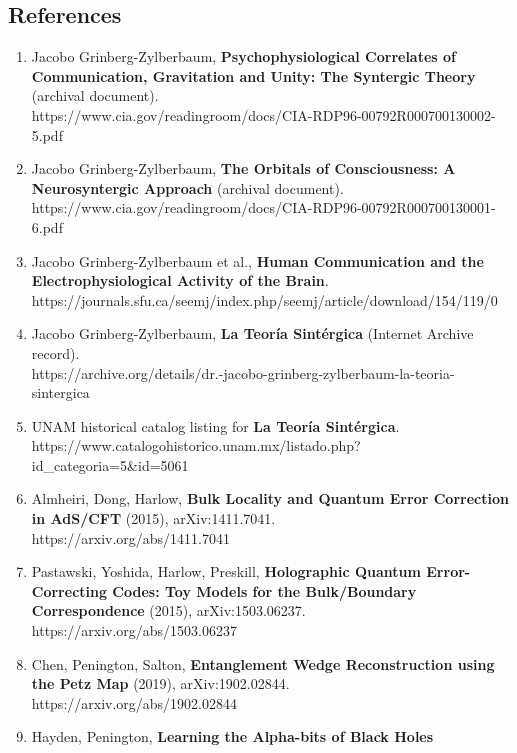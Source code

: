 \documentclass[
]{article}
\providecommand{\tightlist}{%
  \setlength{\itemsep}{0pt}\setlength{\parskip}{0pt}}
\begin{document}
\subsection{References}\label{references}

\begin{enumerate}
\def\labelenumi{\arabic{enumi}.}
\tightlist
\item
  Jacobo Grinberg-Zylberbaum, \textbf{Psychophysiological Correlates of
  Communication, Gravitation and Unity: The Syntergic Theory} (archival
  document).\\
  https://www.cia.gov/readingroom/docs/CIA-RDP96-00792R000700130002-5.pdf
\item
  Jacobo Grinberg-Zylberbaum, \textbf{The Orbitals of Consciousness: A
  Neurosyntergic Approach} (archival document).\\
  https://www.cia.gov/readingroom/docs/CIA-RDP96-00792R000700130001-6.pdf
\item
  Jacobo Grinberg-Zylberbaum et al., \textbf{Human Communication and the
  Electrophysiological Activity of the Brain}.\\
  https://journals.sfu.ca/seemj/index.php/seemj/article/download/154/119/0
\item
  Jacobo Grinberg-Zylberbaum, \textbf{La Teoría Sintérgica} (Internet
  Archive record).\\
  https://archive.org/details/dr.-jacobo-grinberg-zylberbaum-la-teoria-sintergica
\item
  UNAM historical catalog listing for \textbf{La Teoría Sintérgica}.\\
  https://www.catalogohistorico.unam.mx/listado.php?id\_categoria=5\&id=5061
\item
  Almheiri, Dong, Harlow, \textbf{Bulk Locality and Quantum Error
  Correction in AdS/CFT} (2015), arXiv:1411.7041.\\
  https://arxiv.org/abs/1411.7041
\item
  Pastawski, Yoshida, Harlow, Preskill, \textbf{Holographic Quantum
  Error-Correcting Codes: Toy Models for the Bulk/Boundary
  Correspondence} (2015), arXiv:1503.06237.\\
  https://arxiv.org/abs/1503.06237
\item
  Chen, Penington, Salton, \textbf{Entanglement Wedge Reconstruction
  using the Petz Map} (2019), arXiv:1902.02844.\\
  https://arxiv.org/abs/1902.02844
\item
  Hayden, Penington, \textbf{Learning the Alpha-bits of Black Holes}

\end{enumerate}
\end{document}
